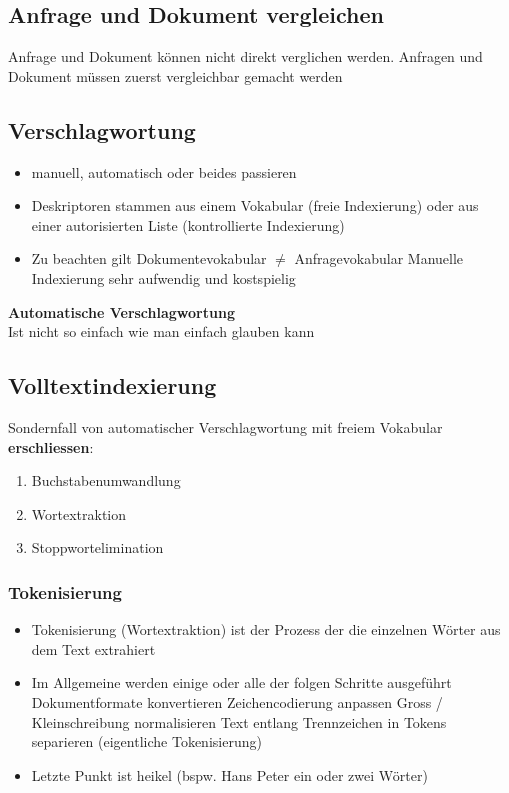 \documentclass{report}
\theoremstyle{definition}
\theoremstyle{example}
\begin{document}
\subsection{Anfrage und Dokument vergleichen}
Anfrage und Dokument können nicht direkt verglichen werden. Anfragen und Dokument müssen zuerst vergleichbar gemacht werden

\subsection{Verschlagwortung}
\begin{itemize}
   \item manuell, automatisch oder beides passieren
   \item Deskriptoren stammen aus einem Vokabular (freie Indexierung) oder aus einer autorisierten Liste (kontrollierte Indexierung)
   \item Zu beachten gilt
   \subitem Dokumentevokabular $\neq$ Anfragevokabular
   \subitem Manuelle Indexierung sehr aufwendig und kostspielig
\end{itemize}

\textbf{Automatische Verschlagwortung}\\
Ist nicht so einfach wie man einfach glauben kann


\subsection{Volltextindexierung}
Sondernfall von automatischer Verschlagwortung mit freiem Vokabular\\
\textbf{erschliessen}:
\begin{enumerate}
   \item Buchstabenumwandlung
   \item Wortextraktion
   \item Stoppwortelimination
\end{enumerate}

\subsubsection{Tokenisierung}
\begin{itemize}
   \item Tokenisierung (Wortextraktion) ist der Prozess der die einzelnen Wörter aus dem Text extrahiert
   \item Im Allgemeine werden einige oder alle der folgen Schritte ausgeführt
   \subitem Dokumentformate konvertieren
   \subitem Zeichencodierung anpassen
   \subitem Gross / Kleinschreibung normalisieren
   \subitem Text entlang Trennzeichen in Tokens separieren (eigentliche Tokenisierung)
   \item Letzte Punkt ist heikel (bspw. Hans Peter ein oder zwei Wörter) 
\end{itemize}
\end{document}
